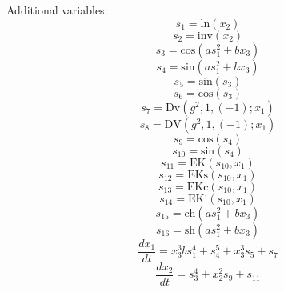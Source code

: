 \documentclass[10pt,a4paper]{article}
\begin{document}
Additional variables:
\begin{equation}s_{1} = \text{ln}(x_{2})\end{equation}
\begin{equation}s_{2} = \text{inv}(x_{2})\end{equation}
\begin{equation}s_{3} = \text{cos}(a  s_{1} ^ {2} + b  x_{3})\end{equation}
\begin{equation}s_{4} = \text{sin}(a  s_{1} ^ {2} + b  x_{3})\end{equation}
\begin{equation}s_{5} = \text{sin}(s_{3})\end{equation}
\begin{equation}s_{6} = \text{cos}(s_{3})\end{equation}
\begin{equation}s_{7} = \text{Dv}(g ^ {2}, 1, (-1); x_{1})\end{equation}
\begin{equation}s_{8} = \text{DV}(g ^ {2}, 1, (-1); x_{1})\end{equation}
\begin{equation}s_{9} = \text{cos}(s_{4})\end{equation}
\begin{equation}s_{10} = \text{sin}(s_{4})\end{equation}
\begin{equation}s_{11} = \text{EK}(s_{10}, x_{1})\end{equation}
\begin{equation}s_{12} = \text{EKs}(s_{10}, x_{1})\end{equation}
\begin{equation}s_{13} = \text{EKc}(s_{10}, x_{1})\end{equation}
\begin{equation}s_{14} = \text{EKi}(s_{10}, x_{1})\end{equation}
\begin{equation}s_{15} = \text{ch}(a  s_{1} ^ {2} + b  x_{3})\end{equation}
\begin{equation}s_{16} = \text{sh}(a  s_{1} ^ {2} + b  x_{3})\end{equation}
\begin{equation}\frac{dx_{1}}{dt} = x_{3} ^ {3}  b  s_{1} ^ {4} + s_{4} ^ {5} + x_{3} ^ {3}  s_{5} + s_{7}\end{equation}
\begin{equation}\frac{dx_{2}}{dt} = s_{3} ^ {4} + x_{2} ^ {2}  s_{9} + s_{11}\end{equation}
\end{document}
